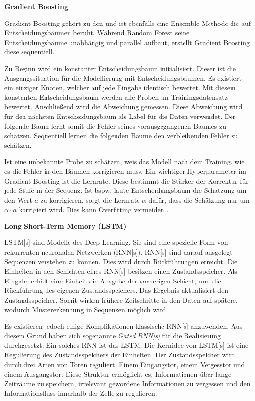 \textbf{Gradient Boosting} \par
Gradient Boosting gehört zu den  und ist ebenfalls eine Ensemble-Methode die auf Entscheidungsbäumen beruht. Während Random Forest seine Entscheidungsbäume unabhängig und parallel aufbaut, erstellt Gradient Boosting diese sequentiell. \par 

Zu Beginn wird ein konstanter Entscheidungsbaum initialisiert. Dieser ist die Ausgangssituation für die Modellierung mit Entscheidungsbäumen. Es existiert ein einziger Knoten, welcher auf jede Eingabe identisch bewertet. Mit diesem konstanten Entscheidungsbaum werden alle Proben im \gls{Trainingsdatensatz} bewertet. Anschließend wird die Abweichung gemessen. Diese Abweichung wird für den nächsten Entscheidungsbaum als \gls{Label} für die Daten verwendet. Der folgende Baum lernt somit die Fehler seines vorausgegangenen Baumes zu schätzen. Sequentiell lernen die folgenden Bäume den verbleibenden Fehler zu schätzen. \par

Ist eine unbekannte Probe zu schätzen, weis das Modell nach dem Training, wie es die Fehler in den Bäumen korrigieren muss. Ein wichtiger \gls{Hyperparameter} im Gradient Boosting ist die Lernrate. Diese bestimmt die Stärker der Korrektur für jede Stufe in der Sequenz. Ist bspw. laute Entscheidungsbaum die Schätzung um den Wert \(a\) zu korrigieren, sorgt die Lernrate \(\alpha\) dafür, dass die Schätzung nur um \(\alpha \cdot a\) korrigiert wird. Dies kann Overfitting vermeiden \cite{Burkov.2019}. \dubpar


\textbf{Long Short-Term Memory (\acrshort{LSTM})} \par
\acrshort{LSTM}[s] sind Modelle des \gls{Deep Learning}. Sie sind eine spezielle Form von rekurrenten neuronalen Netzwerken (\acrshort{RNN}[s]). \acrshort{RNN}[s] sind darauf ausgelegt Sequenzen verstehen zu können. Dies wird durch Rückführungen erreicht. Die Einheiten in den Schichten eines \acrshort{RNN}[s] besitzen einen Zustandsspeicher. Als Eingabe erhält eine Einheit die Ausgabe der vorherigen Schicht, und die Rückführung des eigenen Zustandsspeichers. Das Ergebnis aktualisiert den Zustandsspeicher. Somit wirken frühere Zeitschritte in den Daten auf spätere, wodurch Mustererkennung in Sequenzen möglich wird.\par

Es existieren jedoch einige Komplikationen klassische \acrshort{RNN}[s] anzuwenden. Aus diesem Grund haben sich sogenannte \textit{Gated \acrshort{RNN}[s]} für die Realisierung durchgesetzt. Ein solches \acrshort{RNN} ist das \acrshort{LSTM}. Die Kernidee von \acrshort{LSTM}[s] ist eine Regulierung des Zustandsspeichers der Einheiten. Der Zustandsspeicher wird durch drei Arten von Toren reguliert. Einem Eingangstor, einem Vergesstor und einem Ausgangstor. Diese Struktur ermöglicht es, Informationen über lange Zeiträume zu speichern, irrelevant gewordene Informationen zu vergessen und den Informationsfluss innerhalb der Zelle zu regulieren.

